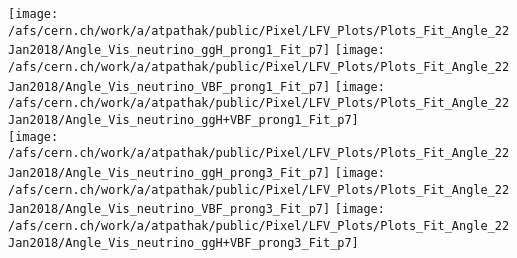 \documentclass{beamer}
\begin{document}
\begin{frame}
\begin{normalsize}
\begin{center}
\texttt{[image: /afs/cern.ch/work/a/atpathak/public/Pixel/LFV\_Plots/Plots\_Fit\_Angle\_22Jan2018/Angle\_Vis\_neutrino\_ggH\_prong1\_Fit\_p7]}
\texttt{[image: /afs/cern.ch/work/a/atpathak/public/Pixel/LFV\_Plots/Plots\_Fit\_Angle\_22Jan2018/Angle\_Vis\_neutrino\_VBF\_prong1\_Fit\_p7]}
\texttt{[image: /afs/cern.ch/work/a/atpathak/public/Pixel/LFV\_Plots/Plots\_Fit\_Angle\_22Jan2018/Angle\_Vis\_neutrino\_ggH+VBF\_prong1\_Fit\_p7]}\\
\texttt{[image: /afs/cern.ch/work/a/atpathak/public/Pixel/LFV\_Plots/Plots\_Fit\_Angle\_22Jan2018/Angle\_Vis\_neutrino\_ggH\_prong3\_Fit\_p7]}
\texttt{[image: /afs/cern.ch/work/a/atpathak/public/Pixel/LFV\_Plots/Plots\_Fit\_Angle\_22Jan2018/Angle\_Vis\_neutrino\_VBF\_prong3\_Fit\_p7]}
\texttt{[image: /afs/cern.ch/work/a/atpathak/public/Pixel/LFV\_Plots/Plots\_Fit\_Angle\_22Jan2018/Angle\_Vis\_neutrino\_ggH+VBF\_prong3\_Fit\_p7]}\\
\end{center}
\end{normalsize}
\end {frame}
\end{document}

